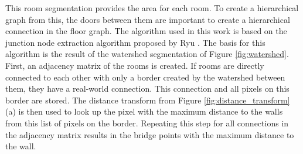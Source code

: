 This room segmentation provides the area for each room. To create a hierarchical graph from this, the doors between them are important to create a hierarchical connection in the floor graph. The algorithm used in this work is based on the junction node extraction algorithm proposed by Ryu \cite{ryu_hierarchical_2020}. The basis for this algorithm is the result of the watershed segmentation of Figure \ref{fig:watershed}. First, an adjacency matrix of the rooms is created. If rooms are directly connected to each other with only a border created by the watershed between them, they have a real-world connection. This connection and all pixels on this border are stored. The distance transform from Figure \ref{fig:distance_transform} (a) is then used to look up the pixel with the maximum distance to the walls from this list of pixels on the border. Repeating this step for all connections in the adjacency matrix results in the bridge points with the maximum distance to the wall. 

